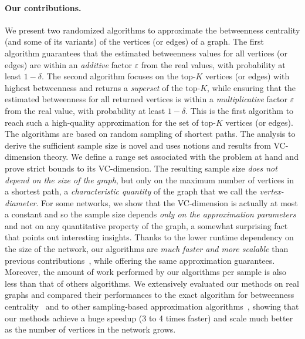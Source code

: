 \paragraph*{Our contributions\ifdmkd.\fi} 
 We present two randomized algorithms to approximate the betweenness centrality
(and some of its variants) of the vertices (or edges) of a graph. The first
algorithm guarantees that the estimated betweenness values for all
vertices (or edges) are within an \emph{additive} factor $\varepsilon$ from the
real values, with probability at
least $1-\delta$. The second algorithm focuses on the top-$K$ vertices (or
edges) with highest betweenness and returns a \emph{superset} of the top-$K$,
while ensuring that the estimated betweenness for all returned vertices is
within a \emph{multiplicative} factor $\varepsilon$ from the real value, with
probability at least $1-\delta$. This is the first algorithm to reach such a
high-quality approximation for the set of top-$K$ vertices (or edges). The
algorithms are based on random sampling of shortest paths. The analysis to
derive the sufficient sample size is novel and uses notions and results from
VC-dimension theory. We define a range set associated with the problem at hand
and prove strict bounds to its VC-dimension. The resulting sample size
\emph{does not depend on the size of the graph}, but only on the maximum number
of vertices in a shortest path, a \emph{characteristic quantity} of the graph
that we call the \emph{vertex-diameter}. For some networks, we show that the
VC-dimension is actually at most a constant and so the sample size depends
\emph{only on the approximation parameters} and not on any quantitative property
of the graph, a somewhat surprising fact that points out interesting insights.
Thanks to the lower runtime dependency on the size of the network, our
algorithms are \emph{much faster and more scalable} than previous
contributions~\citep{JacobKLPT05,BrandesP07,GeisbergerSS08}, while offering the
same approximation guarantees. Moreover, the amount of work performed by our
algorithms per sample is also less than that of others algorithms.  We
extensively evaluated our methods on real graphs and compared their performances
to the exact algorithm for betweenness centrality~\citep{Brandes01} and to other
sampling-based approximation
algorithms~\citep{JacobKLPT05,BrandesP07,GeisbergerSS08}, showing that our
methods achieve a huge speedup (3 to 4 times faster) and scale much better as
the number of vertices in the network grows.

